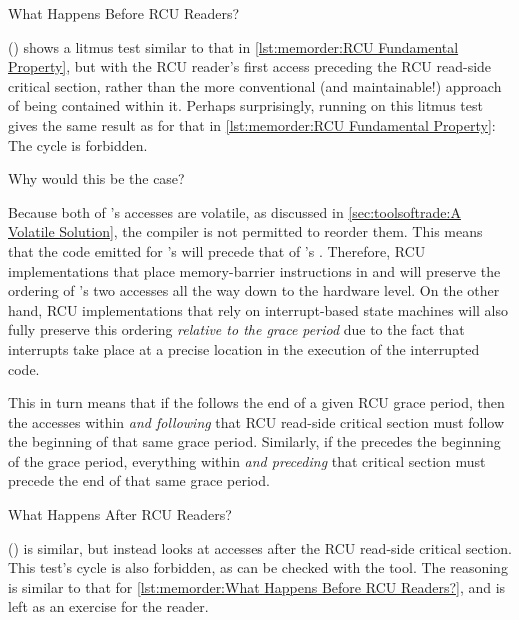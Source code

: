 \begin{listing}[tbp]

\caption{What Happens Before RCU Readers?}
\label{lst:memorder:What Happens Before RCU Readers?}
\end{listing}

()
shows a litmus test similar to that in
\cref{lst:memorder:RCU Fundamental Property},
but with the RCU reader's first access preceding the RCU read-side critical
section, rather than the more conventional (and maintainable!) approach of
being contained within it.
Perhaps surprisingly, running  on this litmus test gives the
same result as for that in
\cref{lst:memorder:RCU Fundamental Property}:
The cycle is forbidden.

Why would this be the case?

Because both of 's accesses are volatile,
as discussed in
\cref{sec:toolsoftrade:A Volatile Solution},
the compiler is not permitted to reorder them.
This means that the code emitted for 's  will
precede that of 's .
Therefore, RCU implementations that place memory-barrier instructions in
 and  will preserve the ordering
of 's two accesses all the way down to the hardware level.
On the other hand, RCU implementations that rely on interrupt-based
state machines will also fully preserve this ordering
\emph{relative to the grace period} due to the fact that interrupts take
place at a precise location in the execution of the interrupted code.

This in turn means that if the  follows the end of a
given RCU grace period, then the accesses within \emph{and following}
that RCU read-side critical section must follow the beginning of that
same grace period.
Similarly, if the  precedes the beginning of the grace
period, everything within \emph{and preceding} that critical section
must precede the end of that same grace period.

\begin{listing}[tbp]

\caption{What Happens After RCU Readers?}
\label{lst:memorder:What Happens After RCU Readers?}
\end{listing}

()
is similar, but instead looks at accesses after the RCU read-side
critical section.
This test's cycle is also forbidden, as can be checked with the 
tool.
The reasoning is similar to that for
\cref{lst:memorder:What Happens Before RCU Readers?},
and is left as an exercise for the reader.

